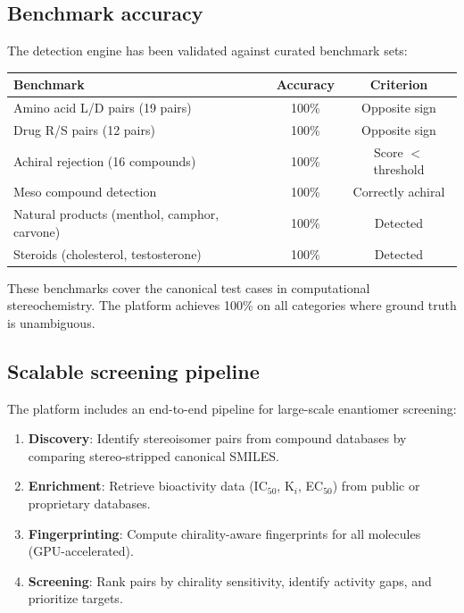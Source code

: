 \documentclass[11pt,a4paper]{article}
\begin{document}
\subsection{Benchmark accuracy}

The detection engine has been validated against curated benchmark sets:

\begin{center}
\begin{tabular}{lcc}
\toprule
\textbf{Benchmark} & \textbf{Accuracy} & \textbf{Criterion} \\
\midrule
Amino acid L/D pairs (19 pairs) & 100\% & Opposite sign \\
Drug R/S pairs (12 pairs) & 100\% & Opposite sign \\
Achiral rejection (16 compounds) & 100\% & Score $<$ threshold \\
Meso compound detection & 100\% & Correctly achiral \\
Natural products (menthol, camphor, carvone) & 100\% & Detected \\
Steroids (cholesterol, testosterone) & 100\% & Detected \\
\bottomrule
\end{tabular}
\end{center}

These benchmarks cover the canonical test cases in computational stereochemistry.
The platform achieves 100\% on all categories where ground truth is unambiguous.

\subsection{Scalable screening pipeline}

The platform includes an end-to-end pipeline for large-scale enantiomer
screening:

\begin{enumerate}[leftmargin=1.5em]
  \item \textbf{Discovery}: Identify stereoisomer pairs from compound databases
    by comparing stereo-stripped canonical SMILES.
  \item \textbf{Enrichment}: Retrieve bioactivity data (IC$_{50}$, K$_i$, EC$_{50}$)
    from public or proprietary databases.
  \item \textbf{Fingerprinting}: Compute chirality-aware fingerprints for all
    molecules (GPU-accelerated).
  \item \textbf{Screening}: Rank pairs by chirality sensitivity, identify
    activity gaps, and prioritize targets.
\end{enumerate}
\end{document}
